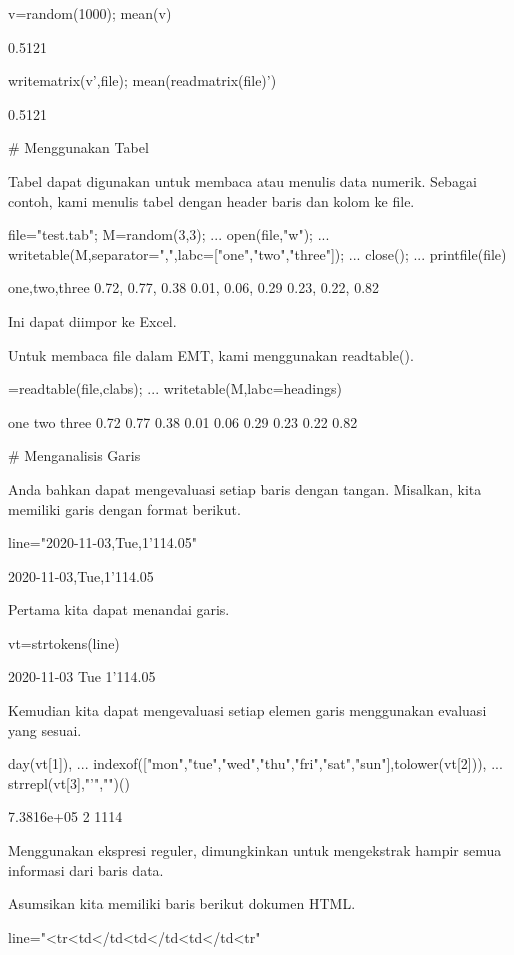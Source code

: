 \documentclass{article}
\begin{document}
\>v=random(1000); mean(v)


    0.5121

\>writematrix(v',file); mean(readmatrix(file)')


    0.5121

# Menggunakan Tabel

Tabel dapat digunakan untuk membaca atau menulis data numerik. Sebagai
contoh, kami menulis tabel dengan header baris dan kolom ke file.


\>file="test.tab"; M=random(3,3);  ...  
\>   open(file,"w");  ...  
\>   writetable(M,separator=",",labc=["one","two","three"]);  ...  
\>   close(); ...  
\>   printfile(file)


    one,two,three
          0.72,      0.77,      0.38
          0.01,      0.06,      0.29
          0.23,      0.22,      0.82

Ini dapat diimpor ke Excel.


Untuk membaca file dalam EMT, kami menggunakan readtable().


=readtable(file,\>clabs); ...  
\>   writetable(M,labc=headings)


           one       two     three
          0.72      0.77      0.38
          0.01      0.06      0.29
          0.23      0.22      0.82

# Menganalisis Garis

Anda bahkan dapat mengevaluasi setiap baris dengan tangan. Misalkan,
kita memiliki garis dengan format berikut.


\>line="2020-11-03,Tue,1'114.05"


    2020-11-03,Tue,1'114.05

Pertama kita dapat menandai garis.


\>vt=strtokens(line)


    2020-11-03
    Tue
    1'114.05

Kemudian kita dapat mengevaluasi setiap elemen garis menggunakan
evaluasi yang sesuai.


\>day(vt[1]),  ...  
\>   indexof(["mon","tue","wed","thu","fri","sat","sun"],tolower(vt[2])),  ...  
\>   strrepl(vt[3],"'","")()


    7.3816e+05
    2
    1114

Menggunakan ekspresi reguler, dimungkinkan untuk mengekstrak hampir
semua informasi dari baris data.


Asumsikan kita memiliki baris berikut dokumen HTML.


\>line="<tr\><td</td\><td</td\><td</td\><tr\>"
\end{document}
